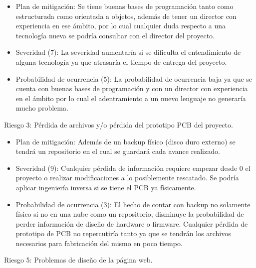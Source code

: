 \documentclass[
11pt, %
]{charter}
\begin{document}
\begin{itemize}

  \item Plan de mitigación: Se tiene buenas bases de programación tanto como estructurada como orientada a objetos, además de tener un director con experiencia en ese ámbito, por lo cual cualquier duda respecto a una tecnología nueva se podría consultar con el director del proyecto.

  \item Severidad (7):
	La severidad aumentaría si se dificulta el entendimiento de alguna tecnología ya que atrasaría el tiempo de entrega del proyecto.
  
  \item Probabilidad de ocurrencia (5): 
  La probabilidad de ocurrencia baja ya que se cuenta con buenas bases de programación y con un director con experiencia en el ámbito por lo cual el adentramiento a un nuevo lenguaje no generaría mucho problema.
  
\end{itemize}

Riesgo 3: Pérdida de archivos y/o pérdida del prototipo PCB del proyecto.

\begin{itemize}

  \item Plan de mitigación: Además de un backup físico (disco duro externo) se tendrá un repositorio en el cual se guardará cada avance realizado.

  \item Severidad (9):
Cualquier pérdida de información requiere empezar desde 0 el proyecto o realizar modificaciones a lo posiblemente rescatado. Se podría aplicar ingeniería inversa si se tiene el PCB ya físicamente.
  
  \item Probabilidad de ocurrencia (3): 
  El hecho de contar con backup no solamente físico si no en una nube como un repositorio, disminuye la probabilidad de perder información de diseño de hardware o firmware. Cualquier pérdida de prototipo de PCB no repercutiría tanto ya que se tendrán los archivos necesarios para fabricación del mismo en poco tiempo.
\end{itemize}
  
  
Riesgo 5: Problemas de diseño de la página web.
\end{document}

